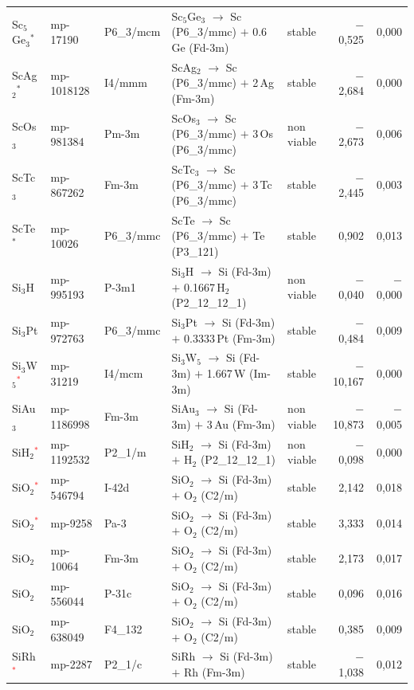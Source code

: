 \begin{longtable}{@{}ll l@{\hspace{4pt}} p{4.6cm} l@{\hspace{4pt}} rr@{}}
Sc$_{5}$Ge$_{3}$$^*$ & mp-17190 & P6\_3/mcm & Sc$_{5}$Ge$_{3}$ $\to$ Sc (P6\_3/mmc) $+$ 0.6\,Ge (Fd-3m) & stable & $-$0{,}525 & 0{,}000 \\
ScAg$_{2}$$^*$ & mp-1018128 & I4/mmm & ScAg$_{2}$ $\to$ Sc (P6\_3/mmc) $+$ 2\,Ag (Fm-3m) & stable & $-$2{,}684 & 0{,}000 \\
ScOs$_{3}$ & mp-981384 & Pm-3m & ScOs$_{3}$ $\to$ Sc (P6\_3/mmc) $+$ 3\,Os (P6\_3/mmc) & non viable & $-$2{,}673 & 0{,}006 \\
ScTc$_{3}$ & mp-867262 & Fm-3m & ScTc$_{3}$ $\to$ Sc (P6\_3/mmc) $+$ 3\,Tc (P6\_3/mmc) & stable & $-$2{,}445 & 0{,}003 \\
ScTe$^*$ & mp-10026 & P6\_3/mmc & ScTe $\to$ Sc (P6\_3/mmc) $+$ Te (P3\_121) & stable & 0{,}902 & 0{,}013 \\
Si$_{3}$H & mp-995193 & P-3m1 & Si$_{3}$H $\to$ Si (Fd-3m) $+$ 0.1667\,H$_{2}$ (P2\_12\_12\_1) & non viable & $-$0{,}040 & $-$0{,}000 \\
Si$_{3}$Pt & mp-972763 & P6\_3/mmc & Si$_{3}$Pt $\to$ Si (Fd-3m) $+$ 0.3333\,Pt (Fm-3m) & stable & $-$0{,}484 & 0{,}009 \\
Si$_{3}$W$_{5}$\textcolor{red}{$^*$} & mp-31219 & I4/mcm & Si$_{3}$W$_{5}$ $\to$ Si (Fd-3m) $+$ 1.667\,W (Im-3m) & stable & $-$10{,}167 & 0{,}000 \\
SiAu$_{3}$ & mp-1186998 & Fm-3m & SiAu$_{3}$ $\to$ Si (Fd-3m) $+$ 3\,Au (Fm-3m) & non viable & $-$10{,}873 & $-$0{,}005 \\
SiH$_{2}$\textcolor{red}{$^*$} & mp-1192532 & P2\_1/m & SiH$_{2}$ $\to$ Si (Fd-3m) $+$ H$_{2}$ (P2\_12\_12\_1) & non viable & $-$0{,}098 & 0{,}000 \\
SiO$_{2}$\textcolor{red}{$^*$} & mp-546794 & I-42d & SiO$_{2}$ $\to$ Si (Fd-3m) $+$ O$_{2}$ (C2/m) & stable & 2{,}142 & 0{,}018 \\
SiO$_{2}$\textcolor{red}{$^*$} & mp-9258 & Pa-3 & SiO$_{2}$ $\to$ Si (Fd-3m) $+$ O$_{2}$ (C2/m) & stable & 3{,}333 & 0{,}014 \\
SiO$_{2}$ & mp-10064 & Fm-3m & SiO$_{2}$ $\to$ Si (Fd-3m) $+$ O$_{2}$ (C2/m) & stable & 2{,}173 & 0{,}017 \\
SiO$_{2}$ & mp-556044 & P-31c & SiO$_{2}$ $\to$ Si (Fd-3m) $+$ O$_{2}$ (C2/m) & stable & 0{,}096 & 0{,}016 \\
SiO$_{2}$ & mp-638049 & F4\_132 & SiO$_{2}$ $\to$ Si (Fd-3m) $+$ O$_{2}$ (C2/m) & stable & 0{,}385 & 0{,}009 \\
SiRh\textcolor{red}{$^*$} & mp-2287 & P2\_1/c & SiRh $\to$ Si (Fd-3m) $+$ Rh (Fm-3m) & stable & $-$1{,}038 & 0{,}012 \\

\end{longtable}
